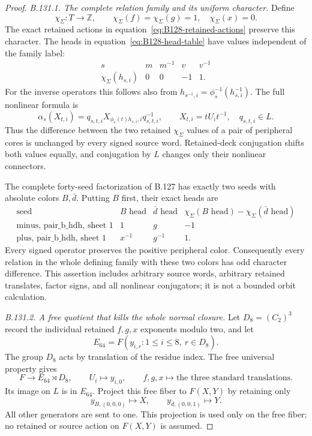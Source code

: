 \begin{proof}
\emph{B.131.1. The complete relation family and its uniform character.}
Define
\[
 \chi_\Sigma:T\to\mathbb Z,\qquad
 \chi_\Sigma(f)=\chi_\Sigma(g)=1,\quad\chi_\Sigma(x)=0.
\]
The exact retained actions in equation~\eqref{eq:B128-retained-actions}
preserve this character. The heads in equation~\eqref{eq:B128-head-table}
have values independent of the family label:
\begin{equation}\label{eq:B131-uniform-heads}
\begin{array}{c|rrrr}
 s&m&m^{-1}&v&v^{-1}\\\hline
 \chi_\Sigma(h_{s,i})&0&0&-1&1.
\end{array}
\end{equation}
For the inverse operators this follows also from
$h_{s^{-1},i}=\phi_s^{-1}(h_{s,i}^{-1})$. The full nonlinear formula is
\[
 \alpha_s(X_{t,i})
   =q_{s,t,i}X_{\phi_s(t)h_{s,i},i}q_{s,t,i}^{-1},
 \qquad X_{t,i}=tU_it^{-1},\quad q_{s,t,i}\in L.
\]
Thus the difference between the two retained $\chi_\Sigma$ values of
a pair of peripheral cores is unchanged by every signed source word.
Retained-deck conjugation shifts both values equally, and conjugation
by $L$ changes only their nonlinear connectors.

The complete forty-seed factorization of B.127 has exactly two seeds
with absolute colors $B,\bar d$. Putting $B$ first, their exact heads are
\begin{equation}\label{eq:B131-two-seeds}
\begin{array}{c|c|c|r}
 \text{seed}&B\text{ head}&\bar d\text{ head}&
      \chi_\Sigma(B\text{ head})-\chi_\Sigma(\bar d\text{ head})\\\hline
 \text{minus, pair\_b\_hdh, sheet 1}&1&g&-1\\
 \text{plus, pair\_b\_hdh, sheet 1}&x^{-1}&g^{-1}&1.
\end{array}
\end{equation}
Every signed operator preserves the positive peripheral color.
Consequently every relation in the whole defining family with these
two colors has odd character difference. This assertion includes
arbitrary source words, arbitrary retained translates, factor signs,
and all nonlinear conjugators; it is not a bounded orbit calculation.

\emph{B.131.2. A free quotient that kills the whole normal closure.}
Let $D_8=(C_2)^3$ record the individual retained $f,g,x$ exponents
modulo two, and let
\[
 E_{64}=F(y_{i,r}:1\leq i\leq8,\ r\in D_8).
\]
The group $D_8$ acts by translation of the residue index. The free
universal property gives
\[
 F\longrightarrow E_{64}\rtimes D_8,\qquad
 U_i\longmapsto y_{i,0},\qquad f,g,x\longmapsto
 \text{the three standard translations}.
\]
Its image on $L$ is in $E_{64}$. Project this free fiber to $F(X,Y)$
by retaining only
\begin{equation}\label{eq:B131-selected-pair}
 y_{B,(0,0,0)}\longmapsto X,
 \qquad y_{\bar d,(0,0,1)}\longmapsto Y.
\end{equation}
All other generators are sent to one. This projection is used only on
the free fiber; no retained or source action on $F(X,Y)$ is assumed.


\end{proof}

